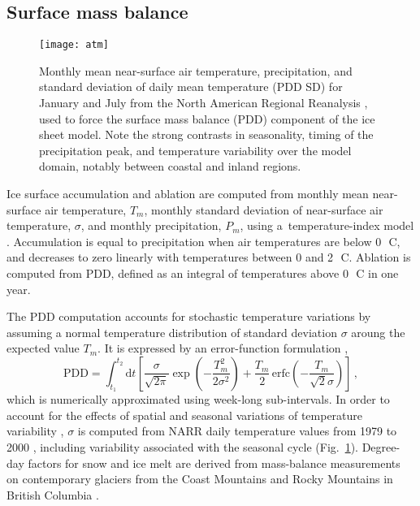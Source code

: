 \documentclass[tc, manuscript]{copernicus}
\begin{document}
\subsection{Surface mass balance}
\label{sec:surface}

\begin{figure}
  \texttt{[image: atm]}
  \caption{Monthly mean near-surface air temperature, precipitation, and
           standard deviation of daily mean temperature (PDD SD) for January
           and July from the North American Regional Reanalysis
           \citep[NARR;][]{Mesinger.etal.2006}, used to force the surface mass
           balance (PDD) component of the ice sheet model. Note the
           strong contrasts in seasonality, timing of the precipitation peak,
           and temperature variability over the model domain, notably between
           coastal and inland regions.}
  \label{fig:atm}
\end{figure}

Ice surface accumulation and ablation are computed from monthly mean
near-surface air temperature, $T_m$, monthly standard deviation of near-surface
air temperature, $\sigma$, and monthly precipitation, $P_m$, using
a~temperature-index model \citep[e.g.,][]{Hock.2003}.
Accumulation is equal to
precipitation when air temperatures are below 0\,\unit{{\degree}C}, and
decreases to zero linearly with temperatures between 0 and
2\,\unit{{\degree}C}. Ablation is computed from PDD, defined as an
integral of temperatures above 0\,\unit{{\degree}C} in one year.

The PDD computation accounts for stochastic temperature variations by assuming
a normal temperature distribution of standard deviation $\sigma$ aroung the
expected value $T_m$. It is expressed by an error-function formulation
\citep{Calov.Greve.2005},
\begin{equation}
    \label{eqn:calovgreve}
    \mathrm{PDD} = \int_{t_1}^{t_2} \mathrm{d}t
        \left[\frac{\sigma}{\sqrt{2\pi}}
                \exp\left({-\frac{T_{m}^2}{2\sigma^2}}\right)
              + \frac{T_{m}}{2} \, \mathrm{erfc}
                \left(-\frac{T_{m}}{\sqrt{2}\sigma}\right)\right] \,,
\end{equation}
which is numerically approximated using week-long sub-intervals. In order to
account for the effects of spatial and seasonal variations of temperature
variability \citep{Seguinot.2013}, $\sigma$ is computed from NARR daily
temperature values from 1979 to 2000 \citep{Mesinger.etal.2006},
including variability associated with the seasonal cycle (Fig.~\ref{fig:atm}).
Degree-day factors for snow and ice melt are derived from
mass-balance measurements on contemporary glaciers from the Coast Mountains and
Rocky Mountains in British Columbia
\citep[Table~\ref{tab:params};][]{Shea.etal.2009}.
\end{document}
